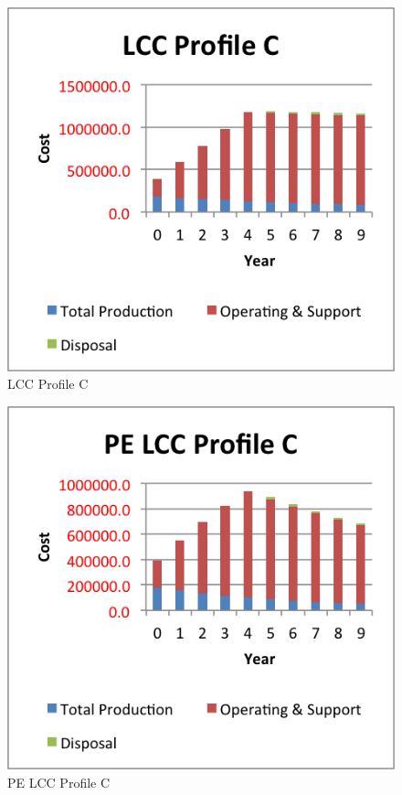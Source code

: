 \documentclass[letterpaper,10pt]{article}
\begin{document}
\begin{figure}[h!tbp]
	\begin{center}
		\includegraphics[scale=0.95]{images/LCCProfileC.png}
	\end{center}
	\caption{LCC Profile C}
	\label{fig:lccprofilec}
\end{figure}

\begin{figure}[h!tbp]
	\begin{center}
		\includegraphics[scale=0.95]{images/PELCCProfileC.png}
	\end{center}
	\caption{PE LCC Profile C}
	\label{fig:pelccprofilec}
\end{figure}
\end{document}
